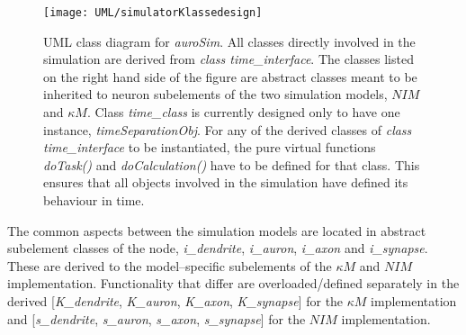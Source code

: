 			\begin{figure}[htbp!]
				\centering
				\texttt{[image: UML/simulatorKlassedesign]}
				\caption[UML class diagram of \emph{auroSim}, the neuron simulator designed to compare $NIM$ and $\kappa M$.]{
						UML class diagram for \emph{auroSim}. %
						All classes directly involved in the simulation are derived from \emph{class time\_interface}.
						The classes listed on the right hand side of the figure are abstract classes meant to be inherited to neuron subelements of the two simulation 
							models, $NIM$ and $\kappa M$. %
						Class \emph{time\_class} is currently designed only to have one instance, \emph{timeSeparationObj}. %
						For any of the derived classes of \emph{class time\_interface} to be instantiated, the pure virtual functions \emph{doTask()} and \emph{doCalculation()} have to be defined for that class.
						This ensures that all objects involved in the simulation have defined its behaviour in time.
						}
				\label{figUMLclassDiagramOfSimulator}
			\end{figure}

			The common aspects between the simulation models are located in abstract subelement classes of the node, \emph{i\_dendrite}, \emph{i\_auron}, \emph{i\_axon} and \emph{i\_synapse}.
			These are derived to the model--specific subelements of the $\kappa M$ and $NIM$ implementation.
			Functionality that differ are overloaded/defined separately in the derived [\emph{K\_dendrite}, \emph{K\_auron}, \emph{K\_axon}, \emph{K\_synapse}] for the $\kappa M$ implementation and 
				[\emph{s\_dendrite}, \emph{s\_auron}, \emph{s\_axon}, \emph{s\_synapse}] for the $NIM$ implementation.

